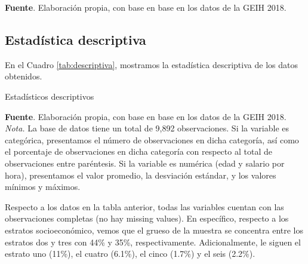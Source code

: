 \vspace{-0.5cm}
\begin{center}
    \textbf{Fuente}. Elaboración propia, con base en base en los datos de la GEIH 2018.
\end{center}

\subsection{Estadística descriptiva}
En el Cuadro \ref{tab:descriptiva}, mostramos la estadística descriptiva de los datos obtenidos.

\begin{table}[H]
\caption{Estadísticos descriptivos}
\label{tab:descriptiva}
\centering
\footnotesize


\begin{center}
    \textbf{Fuente}. Elaboración propia, con base en base en los datos de la GEIH 2018. \\
    \scriptsize{\textit{Nota.} La base de datos tiene un total de 9,892 observaciones. Si la variable es categórica, presentamos el número de observaciones en dicha categoría, así como el porcentaje de observaciones en dicha categoría con respecto al total de observaciones entre paréntesis. Si la variable es numérica (edad y salario por hora), presentamos el valor promedio, la desviación estándar, y los valores mínimos y máximos.}
\end{center}

\end{table}


Respecto a los datos en la tabla anterior, todas las variables cuentan con las observaciones completas (no hay missing values). En específico, respecto a los estratos socioeconómico, vemos que el grueso de la muestra se concentra entre los estratos dos y tres con 44\% y 35\%, respectivamente. Adicionalmente, le siguen el estrato uno (11\%), el cuatro (6.1\%), el cinco (1.7\%) y el seis (2.2\%). \\

